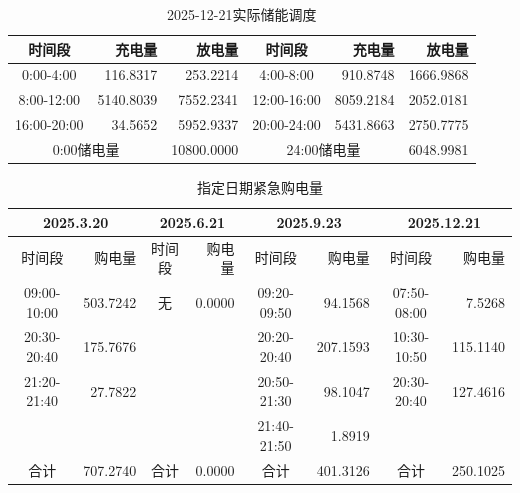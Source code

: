 \begin{table}[htbp]\centering
\caption{2025-12-21实际储能调度}
\begin{tabular}{|c|r|r|c|r|r|}\hline
时间段 & 充电量 & 放电量 & 时间段 & 充电量 & 放电量 \\ \hline
0:00-4:00 & 116.8317 & 253.2214 & 4:00-8:00 & 910.8748 & 1666.9868 \\ \hline
8:00-12:00 & 5140.8039 & 7552.2341 & 12:00-16:00 & 8059.2184 & 2052.0181 \\ \hline
16:00-20:00 & 34.5652 & 5952.9337 & 20:00-24:00 & 5431.8663 & 2750.7775 \\ \hline
\multicolumn{2}{|c|}{0:00储电量} & 10800.0000 & \multicolumn{2}{c|}{24:00储电量} & 6048.9981 \\ \hline
\end{tabular}\end{table}
\begin{table}[htbp]\centering
\caption{指定日期紧急购电量}
\small\begin{tabular}{|c|r|c|r|c|r|c|r|}\hline
\multicolumn{2}{|c|}{2025.3.20} & \multicolumn{2}{c|}{2025.6.21} & \multicolumn{2}{c|}{2025.9.23} & \multicolumn{2}{c|}{2025.12.21} \\ \hline
时间段 & 购电量 & 时间段 & 购电量 & 时间段 & 购电量 & 时间段 & 购电量 \\ \hline
09:00-10:00 & 503.7242 & 无 & 0.0000 & 09:20-09:50 & 94.1568 & 07:50-08:00 & 7.5268 \\ \hline
20:30-20:40 & 175.7676 &  &  & 20:20-20:40 & 207.1593 & 10:30-10:50 & 115.1140 \\ \hline
21:20-21:40 & 27.7822 &  &  & 20:50-21:30 & 98.1047 & 20:30-20:40 & 127.4616 \\ \hline
 &  &  &  & 21:40-21:50 & 1.8919 &  &  \\ \hline
合计 & 707.2740 & 合计 & 0.0000 & 合计 & 401.3126 & 合计 & 250.1025 \\ \hline
\end{tabular}\end{table}

